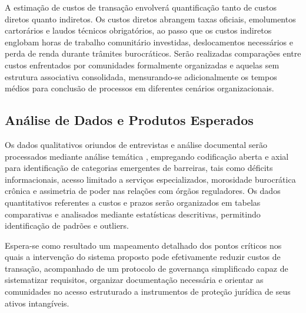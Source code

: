 A estimação de custos de transação envolverá quantificação tanto de custos diretos quanto indiretos. Os custos diretos abrangem taxas oficiais, emolumentos cartorários e laudos técnicos obrigatórios, ao passo que os custos indiretos englobam horas de trabalho comunitário investidas, deslocamentos necessários e perda de renda durante trâmites burocráticos. Serão realizadas comparações entre custos enfrentados por comunidades formalmente organizadas e aquelas sem estrutura associativa consolidada, mensurando-se adicionalmente os tempos médios para conclusão de processos em diferentes cenários organizacionais.

\subsection{Análise de Dados e Produtos Esperados}

Os dados qualitativos oriundos de entrevistas e análise documental serão processados mediante análise temática \cite{Braun2006}, empregando codificação aberta e axial para identificação de categorias emergentes de barreiras, tais como déficits informacionais, acesso limitado a serviços especializados, morosidade burocrática crônica e assimetria de poder nas relações com órgãos reguladores. Os dados quantitativos referentes a custos e prazos serão organizados em tabelas comparativas e analisados mediante estatísticas descritivas, permitindo identificação de padrões e outliers.

Espera-se como resultado um mapeamento detalhado dos pontos críticos nos quais a intervenção do sistema proposto pode efetivamente reduzir custos de transação, acompanhado de um protocolo de governança simplificado capaz de sistematizar requisitos, organizar documentação necessária e orientar as comunidades no acesso estruturado a instrumentos de proteção jurídica de seus ativos intangíveis.
